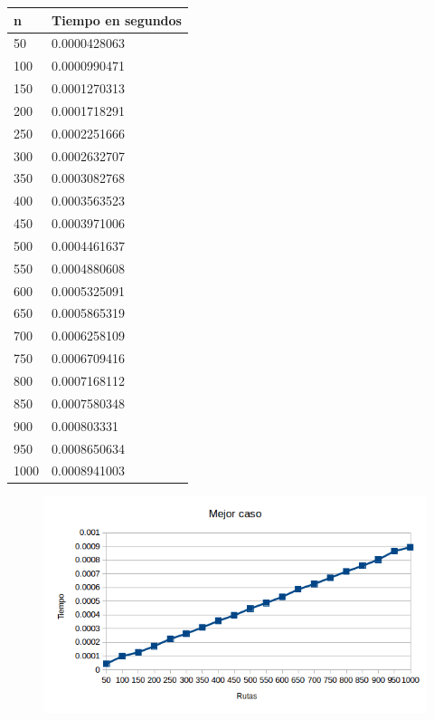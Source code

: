   \begin{table}[htb]
  \centering
  \begin{tabular}[c]{|l|l|}

		\hline
n & Tiempo en segundos\\
		\hline
50	&	0.0000428063\\
		\hline
100	&	0.0000990471\\
		\hline
150	&	0.0001270313\\
		\hline
200	&	0.0001718291\\
		\hline
250	&	0.0002251666\\
		\hline
300	&	0.0002632707\\
		\hline
350	&	0.0003082768\\
		\hline
400	&	0.0003563523\\
		\hline
450	&	0.0003971006\\
		\hline
500	&	0.0004461637\\
		\hline
550	&	0.0004880608\\
		\hline
600	&	0.0005325091\\
		\hline
650	&	0.0005865319\\
		\hline
700	&	0.0006258109\\
		\hline
750	&	0.0006709416\\
		\hline
800	&	0.0007168112\\
		\hline
850	&	0.0007580348\\
		\hline
900	&	0.000803331\\
		\hline
950	&	0.0008650634\\
		\hline
1000	&	0.0008941003\\
		\hline

	\end{tabular}
	\end{table}

\newpage
	
  \begin{figure}[h!]
   \begin{center}
 	\includegraphics[scale=0.8]{imagenes/ej1/mejorCaso.png}
   \end{center}
 \end{figure}
 
